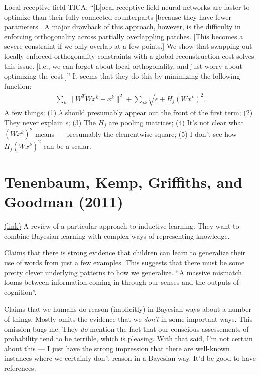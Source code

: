 \documentclass[12pt]{report}
\newcommand{\link}[2]{\href{#1}{#2}}
\begin{document}
Local receptive field TICA: ``[L]ocal receptive field neural networks
are faster to optimize than their fully connected counterparts
[because they have fewer parameters].  A major drawback of this
approach, however, is the difficulty in enforcing orthogonality across
partially overlappling patches.  [This becomes a severe constraint if
we only overlap at a few points.]  We show that swapping out locally
enforced orthogonality constraints with a global reconstruction cost
solves this issue. [I.e., we can forget about local orthogonality, and
just worry about optimizing the cost.]''  It seems that they do this
by minimizing the following function:
\begin{eqnarray}
  \sum_k \| W^T W x^k-x^k\|^2+ \sum_{jk} \sqrt{\epsilon+H_j (Wx^k)^2}.
\end{eqnarray}
A few things: (1) $\lambda$ should presumably appear out the front of
the first term; (2) They never explain $\epsilon$; (3) The $H_j$ are
pooling matrices; (4) It's not clear what $(Wx^k)^2$ means ---
presumably the elementwise square; (5) I don't see how $H_j (Wx^k)^2$
can be a scalar.

\section{Tenenbaum, Kemp, Griffiths, and Goodman (2011)}

\link{http://scholar.google.ca/scholar?cluster=2667398573353002097&hl=en&as_sdt=0,5}{(link)}
A review of a particular approach to inductive learning.  They want to
combine Bayesian learning with complex ways of representing knowledge.

Claims that there is strong evidence that children can learn to
generalize their use of words from just a few examples.  This suggests
that there must be some pretty clever underlying patterns to how we
generalize.  ``A massive mismatch looms between information coming in
through our senses and the outputs of cognition''.  

Claims that we humans do reason (implicitly) in Bayesian ways about a
number of things.  Mostly omits the evidence that we \emph{don't} in
some important ways.  This omission bugs me.  They \emph{do} mention
the fact that our conscious assessements of probability tend to be
terrible, which is pleasing.  With that said, I'm not certain about
this --- I just have the strong impression that there are well-known
instances where we certainly don't reason in a Bayesian way.  It'd be
good to have references.
\end{document}
